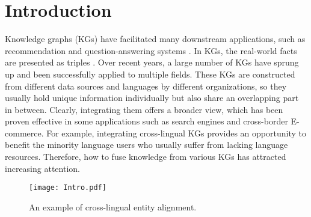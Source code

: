 \documentclass[sigconf]{acmart}
\begin{document}

\maketitle

\section{Introduction}
\label{sec:intro}
Knowledge graphs (KGs) have facilitated many downstream applications, such as recommendation \cite{DBLP:conf/www/0003W0HC19,DBLP:conf/www/WangZZLXG19} and question-answering systems \cite{DBLP:conf/www/ZhaoXQB20,DBLP:conf/wsdm/QiuWJZ20}.
In KGs, the real-world facts are presented as triples .
Over recent years, a large number of KGs have sprung up and been successfully applied to multiple fields.
These KGs are constructed from different data sources and languages by different organizations, so they usually hold unique information individually but also share an overlapping part in between.
Clearly, integrating them offers a broader view, which has been proven effective in some applications such as search engines and cross-border E-commerce.
For example, integrating cross-lingual KGs provides an opportunity to benefit the minority language users who usually suffer from lacking language resources.
Therefore, how to fuse knowledge from various KGs has attracted increasing attention.
\begin{figure}
    \centering
    \texttt{[image: Intro.pdf]}
    \caption{An example of cross-lingual entity alignment.}
    \label{fig:intro}
    \vspace{-1em}
\end{figure}
\end{document}
